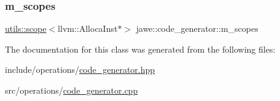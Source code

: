 \subsubsection{\texorpdfstring{m\+\_\+scopes}{m\_scopes}}
{\footnotesize\ttfamily \hyperlink{classjawe_1_1utils_1_1scope}{utils\+::scope}$<$llvm\+::\+Alloca\+Inst$\ast$$>$ jawe\+::code\+\_\+generator\+::m\+\_\+scopes\hspace{0.3cm}{\ttfamily [private]}}



The documentation for this class was generated from the following files\+:\begin{DoxyCompactItemize}
\item 
include/operations/\hyperlink{code__generator_8hpp}{code\+\_\+generator.\+hpp}\item 
src/operations/\hyperlink{code__generator_8cpp}{code\+\_\+generator.\+cpp}\end{DoxyCompactItemize}
